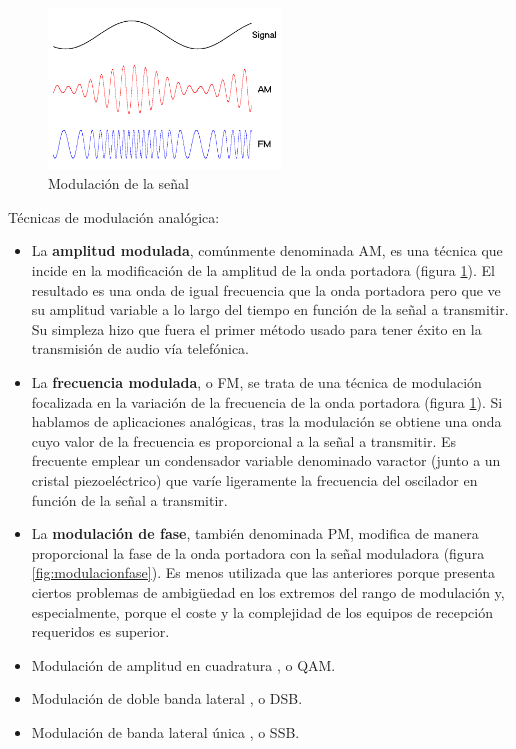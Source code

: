 \begin{figure}[tb]
\centering
\includegraphics[width=0.55\textwidth]{figuras/Modulacion.png}
\caption{Modulación de la señal}
\label{fig:modulacion}
\end{figure}

Técnicas de modulación analógica:
\begin{itemize}
\item La \textbf{amplitud modulada}, comúnmente denominada AM, es una técnica que incide en la modificación de la amplitud de la onda portadora (figura \ref{fig:modulacion}). El resultado es una onda de igual frecuencia que la onda portadora pero que ve su amplitud variable a lo largo del tiempo en función de la señal a transmitir. Su simpleza hizo que fuera el primer método usado para tener éxito en la transmisión de audio vía telefónica.
\item La \textbf{frecuencia modulada}, o FM, se trata de una técnica de modulación focalizada en la variación de la frecuencia de la onda portadora \cite{DEI:2014} (figura \ref{fig:modulacion}). Si hablamos de aplicaciones analógicas, tras la modulación se obtiene una onda cuyo valor de la frecuencia es proporcional a la señal a transmitir. Es frecuente emplear un condensador variable denominado varactor (junto a un cristal piezoeléctrico) que varíe ligeramente la frecuencia del oscilador en función de la señal a transmitir.
\item La \textbf{modulación de fase}, también denominada PM, modifica de manera proporcional la fase de la onda portadora con la señal moduladora (figura \ref{fig:modulacionfase}). Es menos utilizada que las anteriores porque presenta ciertos problemas de ambigüedad en los extremos del rango de modulación y, especialmente, porque el coste y la complejidad de los equipos de recepción requeridos es superior.
\item Modulación de amplitud en cuadratura \cite{DEI:2014}, o QAM.
\item Modulación de doble banda lateral \cite{DEI:2014}, o DSB.
\item Modulación de banda lateral única \cite{DEI:2014}, o SSB.
\end{itemize}

